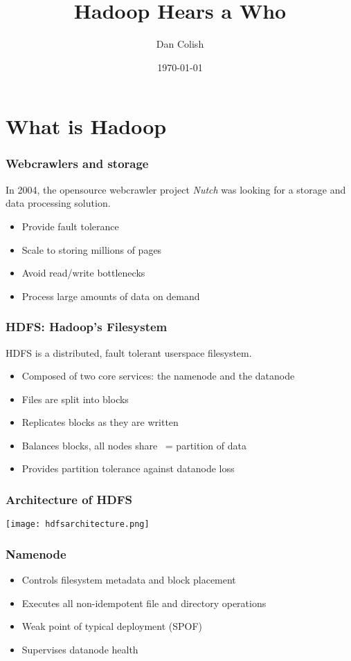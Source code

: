 \documentclass{beamer}
\title{Hadoop Hears a Who}
\author{Dan Colish}
\date{\today}
\begin{document}
\frame{\titlepage}

\section{What is Hadoop}

\frame
{
  \frametitle{Webcrawlers and storage}
  In 2004, the opensource webcrawler project \emph{Nutch} was looking for a
  storage and data processing solution.

  \begin{itemize}
    \item Provide fault tolerance
    \item Scale to storing millions of pages
    \item Avoid read/write bottlenecks
    \item Process large amounts of data on demand
  \end{itemize}

}


\frame
{
  \frametitle{HDFS: Hadoop's Filesystem}

  HDFS is a distributed, fault tolerant userspace filesystem.

  \begin{itemize}
    \item Composed of two core services: the namenode and the datanode
    \item Files are split into blocks
    \item Replicates blocks as they are written
    \item Balances blocks, all nodes share ~= partition of data
    \item Provides partition tolerance against datanode loss
  \end {itemize}

}

\frame
{
  \frametitle{Architecture of HDFS}
  \texttt{[image: hdfsarchitecture.png]}
  \cite{hadoopdocs}
}

\frame 
{
  \frametitle{Namenode}
  \begin{itemize}
    \item Controls filesystem metadata and block placement
    \item Executes all non-idempotent file and directory operations
    \item Weak point of typical deployment (SPOF)
    \item Supervises datanode health
  \end{itemize}
}
\end{document}
